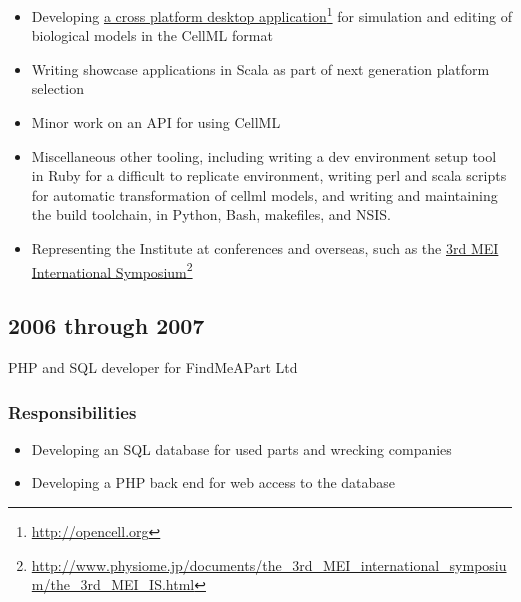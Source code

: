 \documentclass[10pt,oneside]{memoir}
\begin{document}
\begin{itemize}


\item Developing \href{http://opencell.org}{a cross platform desktop application}\footnote{\href{http://opencell.org}{http://opencell.org}} for simulation and editing of biological models in the CellML format

\item Writing showcase applications in Scala as part of next generation platform selection

\item Minor work on an API for using CellML

\item Miscellaneous other tooling, including writing a dev environment setup tool in Ruby for a difficult to replicate environment, writing perl and scala scripts for automatic transformation of cellml models, and writing and maintaining the build toolchain, in Python, Bash, makefiles, and NSIS.

\item Representing the Institute at conferences and overseas, such as the \href{http://www.physiome.jp/documents/the_3rd_MEI_international_symposium/the_3rd_MEI_IS.html}{3rd MEI International Symposium}\footnote{\href{http://www.physiome.jp/documents/the_3rd_MEI_international_symposium/the_3rd_MEI_IS.html}{http://www.physiome.jp/documents/the\_3rd\_MEI\_international\_symposium/the\_3rd\_MEI\_IS.html}}
\end{itemize}

\subsection*{2006 through 2007}
\label{through2007}

PHP and SQL developer for FindMeAPart Ltd


\subsubsection*{Responsibilities}
\label{responsibilities}

\begin{itemize}


\item Developing an SQL database for used parts and wrecking companies

\item Developing a PHP back end for web access to the database
\end{itemize}
\end{document}
